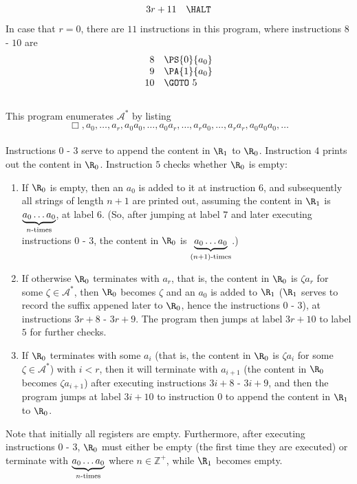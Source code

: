 \begin{enumerate}[1.]
\begin{enumerate}[(a)]
\[\begin{array}{rl}
3r + 11 & \HALT
\end{array}
\]
In case that $r = 0$, there are $11$ instructions in this program, where instructions $8$ - $10$ are
\[
\begin{array}{rl}
8 & \PS{0}{a_0} \cr
9 & \PA{1}{a_0} \cr
10 & \GOTO \ 5 \cr
\end{array}
\]
\ \\
This program enumerates $\mathcal{A}^\ast$ by listing
\[
\Box, a_0, \ldots, a_r, a_0a_0, \ldots, a_0a_r, \ldots, a_ra_0, \ldots, a_ra_r, a_0a_0a_0, \ldots
\]
\ \\
Instructions $0$ - $3$ serve to append the content in $\R_1$ to $\R_0$. Instruction $4$ prints out the content in $\R_0$. Instruction $5$ checks whether $\R_0$ is empty:
\begin{enumerate}[(1)]
\item If $\R_0$ is empty, then an $a_0$ is added to it at instruction $6$, and subsequently all strings of length $n + 1$ are printed out, assuming the content in $\R_1$ is $\underbrace{a_0 \ldots a_0}_{n\mbox{\scriptsize-times}}$, at label $6$. (So, after jumping at label $7$ and later executing instructions $0$ - $3$, the content in $\R_0$ is $\underbrace{a_0 \ldots a_0}_{(n + 1)\mbox{\scriptsize-times}}$.)
\item If otherwise $\R_0$ terminates with $a_r$, that is, the content in $\R_0$ is $\zeta a_r$ for some $\zeta \in \mathcal{A}^\ast$, then $\R_0$ becomes $\zeta$ and an $a_0$ is added to $\R_1$ ($\R_1$ serves to record the suffix appened later to $\R_0$, hence the instructions $0$ - $3$), at instructions $3r + 8$ - $3r + 9$. The program then jumps at label $3r + 10$ to label $5$ for further checks.
\item If $\R_0$ terminates with some $a_i$ (that is, the content in $\R_0$ is $\zeta a_i$ for some $\zeta \in \mathcal{A}^\ast$) with $i < r$, then it will terminate with $a_{i + 1}$ (the content in $\R_0$ becomes $\zeta a_{i + 1}$) after executing instructions $3i + 8$ - $3i + 9$, and then the program jumps at label $3i + 10$ to instruction $0$ to append the content in $\R_1$ to $\R_0$.
\end{enumerate}
Note that initially all registers are empty. Furthermore, after executing instructions $0$ - $3$, $\R_0$ must either be empty (the first time they are executed) or terminate with $\underbrace{a_0 \ldots a_0}_{\mbox{\scriptsize\begin{math}n\end{math}-times}}$ where $n \in \mathbb{Z}^+$, while $\R_1$ becomes empty.

\end{enumerate}
\end{enumerate}

